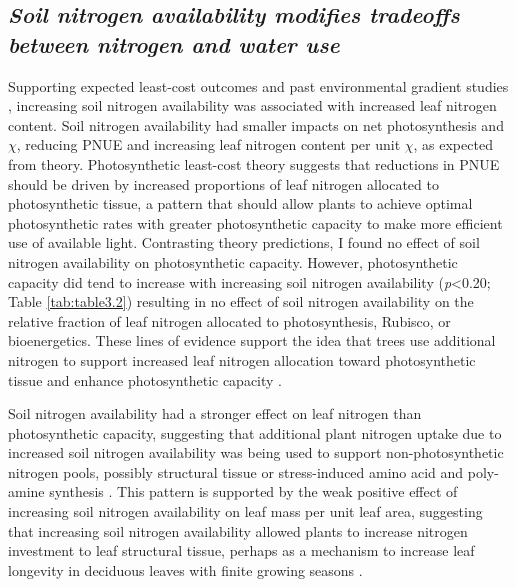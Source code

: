 \subsection{\textit{Soil nitrogen availability modifies tradeoffs between nitrogen and water use}}
\noindent Supporting expected least-cost outcomes and past environmental gradient studies , increasing soil nitrogen availability was associated with increased leaf nitrogen content. Soil nitrogen availability had smaller impacts on net photosynthesis and $\chi$, reducing PNUE and increasing leaf nitrogen content per unit $\chi$, as expected from theory. Photosynthetic least-cost theory suggests that reductions in PNUE should be driven by increased proportions of leaf nitrogen allocated to photosynthetic tissue, a pattern that should allow plants to achieve optimal photosynthetic rates with greater photosynthetic capacity to make more efficient use of available light. Contrasting theory predictions, I found no effect of soil nitrogen availability on photosynthetic capacity. However, photosynthetic capacity did tend to increase with increasing soil nitrogen availability (\textit{p}<0.20; Table \ref{tab:table3.2}) resulting in no effect of soil nitrogen availability on the relative fraction of leaf nitrogen allocated to photosynthesis, Rubisco, or bioenergetics. These lines of evidence support the idea that trees use additional nitrogen to support increased leaf nitrogen allocation toward photosynthetic tissue and enhance photosynthetic capacity .

Soil nitrogen availability had a stronger effect on leaf nitrogen than photosynthetic capacity, suggesting that additional plant nitrogen uptake due to increased soil nitrogen availability was being used to support non-photosynthetic nitrogen pools, possibly structural tissue or stress-induced amino acid and poly-amine synthesis . This pattern is supported by the weak positive effect of increasing soil nitrogen availability on leaf mass per unit leaf area, suggesting that increasing soil nitrogen availability allowed plants to increase nitrogen investment to leaf structural tissue, perhaps as a mechanism to increase leaf longevity in deciduous leaves with finite growing seasons .
    
